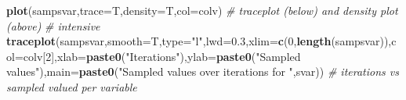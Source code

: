 \documentclass[10,portrait]{article}
\newenvironment{Shaded}{\begin{snugshade}}{\end{snugshade}}
\newcommand{\KeywordTok}[1]{\textcolor[rgb]{0.13,0.29,0.53}{\textbf{#1}}}
\newcommand{\DataTypeTok}[1]{\textcolor[rgb]{0.13,0.29,0.53}{#1}}
\newcommand{\DecValTok}[1]{\textcolor[rgb]{0.00,0.00,0.81}{#1}}
\newcommand{\FloatTok}[1]{\textcolor[rgb]{0.00,0.00,0.81}{#1}}
\newcommand{\StringTok}[1]{\textcolor[rgb]{0.31,0.60,0.02}{#1}}
\newcommand{\CommentTok}[1]{\textcolor[rgb]{0.56,0.35,0.01}{\textit{#1}}}
\newcommand{\NormalTok}[1]{#1}
\begin{document}
\begin{Shaded}
\begin{Highlighting}[]
\KeywordTok{plot}\NormalTok{(sampsvar,}\DataTypeTok{trace=}\NormalTok{T,}\DataTypeTok{density=}\NormalTok{T,}\DataTypeTok{col=}\NormalTok{colv) }\CommentTok{# traceplot (below) and density plot (above)}
\CommentTok{# intensive  }
\KeywordTok{traceplot}\NormalTok{(sampsvar,}\DataTypeTok{smooth=}\NormalTok{T,}\DataTypeTok{type=}\StringTok{"l"}\NormalTok{,}\DataTypeTok{lwd=}\FloatTok{0.3}\NormalTok{,}\DataTypeTok{xlim=}\KeywordTok{c}\NormalTok{(}\DecValTok{0}\NormalTok{,}\KeywordTok{length}\NormalTok{(sampsvar)),}\DataTypeTok{col=}\NormalTok{colv[}\DecValTok{2}\NormalTok{],}\DataTypeTok{xlab=}\KeywordTok{paste0}\NormalTok{(}\StringTok{"Iterations"}\NormalTok{),}\DataTypeTok{ylab=}\KeywordTok{paste0}\NormalTok{(}\StringTok{"Sampled values"}\NormalTok{),}\DataTypeTok{main=}\KeywordTok{paste0}\NormalTok{(}\StringTok{"Sampled values over iterations for "}\NormalTok{,svar)) }\CommentTok{# iterations vs sampled valued per variable }


\end{Highlighting}
\end{Shaded}
\end{document}
